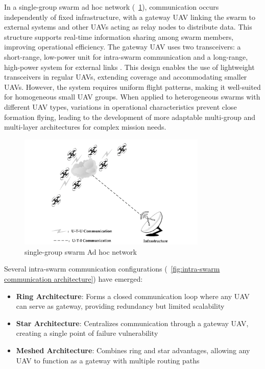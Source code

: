In a single-group swarm ad hoc network (~\ref{fig:single-group_swarm_Ad_hoc_network}), communication occurs independently of fixed infrastructure, with a gateway UAV linking the swarm to external systems and other UAVs acting as relay nodes to distribute data. This structure supports real-time information sharing among swarm members, improving operational efficiency. The gateway UAV uses two transceivers: a short-range, low-power unit for intra-swarm communication and a long-range, high-power system for external links \cite{Chen2020}. This design enables the use of lightweight transceivers in regular UAVs, extending coverage and accommodating smaller UAVs. However, the system requires uniform flight patterns, making it well-suited for homogeneous small UAV groups. When applied to heterogeneous swarms with different UAV types, variations in operational characteristics prevent close formation flying, leading to the development of more adaptable multi-group and multi-layer architectures for complex mission needs.


\begin{figure}[ht]
\centering
\includegraphics[width=0.8\textwidth]{Figures/Chapter1/Section5/2.png}
\caption{single-group swarm Ad hoc network \cite{Chen2020}}
\label{fig:single-group_swarm_Ad_hoc_network}
\end{figure}



Several intra-swarm communication  configurations (~\ref{fig:intra-swarm communication architecture}) have emerged:
\begin{itemize}
\item \textbf{Ring Architecture}: Forms a closed communication loop where any UAV can serve as gateway, providing redundancy but limited scalability
\item \textbf{Star Architecture}: Centralizes communication through a gateway UAV, creating a single point of failure vulnerability
\item \textbf{Meshed Architecture}: Combines ring and star advantages, allowing any UAV to function as a gateway with multiple routing paths
\end{itemize}

